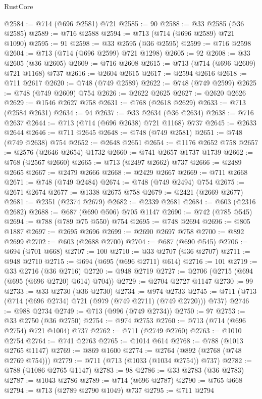 \begin{lexlean}{RustCore}
\begin{coremodule}
@2584 := @714 (@696 @2581) @721
@2585 := 90
@2588 := @33 @2585 (@36 @2585)
@2589 := @716 @2588
@2594 := @713 (@714 (@696 @2589) @721 @1090)
@2595 := 91
@2598 := @33 @2595 (@36 @2595)
@2599 := @716 @2598
@2604 := @713 (@714 (@696 @2599) @721 @1298)
@2605 := 92
@2608 := @33 @2605 (@36 @2605)
@2609 := @716 @2608
@2615 := @713 (@714 (@696 @2609) @721 @1168) @737
@2616 := @2604 @2615
@2617 := @2594 @2616
@2618 := @711 @2617
@2620 := @748 (@749 @2589)
@2622 := @748 (@749 @2599)
@2625 := @748 (@749 @2609) @754
@2626 := @2622 @2625
@2627 := @2620 @2626
@2629 := @1546 @2627 @758
@2631 := @768 (@2618 @2629)
@2633 := @713 (@2584 @2631)
@2634 := 94
@2637 := @33 @2634 (@36 @2634)
@2638 := @716 @2637
@2644 := @713 (@714 (@696 @2638) @721 @1168) @737
@2645 := @2633 @2644
@2646 := @711 @2645
@2648 := @748 (@749 @2581)
@2651 := @748 (@749 @2638) @754
@2652 := @2648 @2651
@2654 := @1176 @2652 @758
@2657 := @2576 (@2646 @2654) @1732
@2660 := @741 @2657 @1737 @1739
@2662 := @768 (@2567 @2660)
@2665 := @713 (@2497 @2662) @737
@2666 := @2489 @2665
@2667 := @2479 @2666
@2668 := @2429 @2667
@2669 := @711 @2668
@2671 := @748 (@749 @2484)
@2674 := @748 (@749 @2494) @754
@2675 := @2671 @2674
@2677 := @1338 @2675 @758
@2679 := @2421 (@2669 @2677)
@2681 := @2351 (@2374 @2679)
@2682 := @2339 @2681
@2684 := @603 (@2316 @2682)
@2688 := @687 (@690 @506) @705 @1147
@2690 := @742 (@785 @545)
@2694 := @788 (@789 @75 @550) @754
@2695 := @748 @2694
@2696 := @805 @1887
@2697 := @2695 @2696
@2699 := @2690 @2697 @758
@2700 := @892 @2699
@2702 := @603 (@2688 @2700)
@2704 := @687 (@690 @545)
@2706 := @694 (@701 @668)
@2707 := 100
@2710 := @33 @2707 (@36 @2707)
@2711 := @948 @2710
@2715 := @694 (@695 (@696 @2711) @614)
@2716 := 101
@2719 := @33 @2716 (@36 @2716)
@2720 := @948 @2719
@2727 := @2706 (@2715 (@694 (@695 (@696 @2720) @614) @704))
@2729 := @2704 @2727 @1147
@2730 := 99
@2733 := @33 @2730 (@36 @2730)
@2734 := @974 @2733
@2745 := @711 (@713 (@714 (@696 @2734) @721 (@979 (@749 @2711) (@749 @2720))) @737)
@2746 := @988 @2734
@2749 := @713 (@996 (@749 @2734))
@2750 := 97
@2753 := @33 @2750 (@36 @2750)
@2754 := @974 @2753
@2760 := @713 (@714 (@696 @2754) @721 @1004) @737
@2762 := @711 (@2749 @2760)
@2763 := @1010 @2754
@2764 := @741 @2763
@2765 := @1014 @614
@2768 := @788 (@1013 @2765 @1147)
@2769 := @869 @1600
@2774 := @2764 (@892 (@2768 (@748 @2769 @754)))
@2779 := @711 (@713 (@1033 (@1034 @2754)) @737)
@2782 := @788 (@1086 @2765 @1147)
@2783 := 98
@2786 := @33 @2783 (@36 @2783)
@2787 := @1043 @2786
@2789 := @714 (@696 @2787)
@2790 := @765 @668
@2794 := @713 (@2789 @2790 @1049) @737
@2795 := @711 @2794

\end{coremodule}
\end{lexlean}
